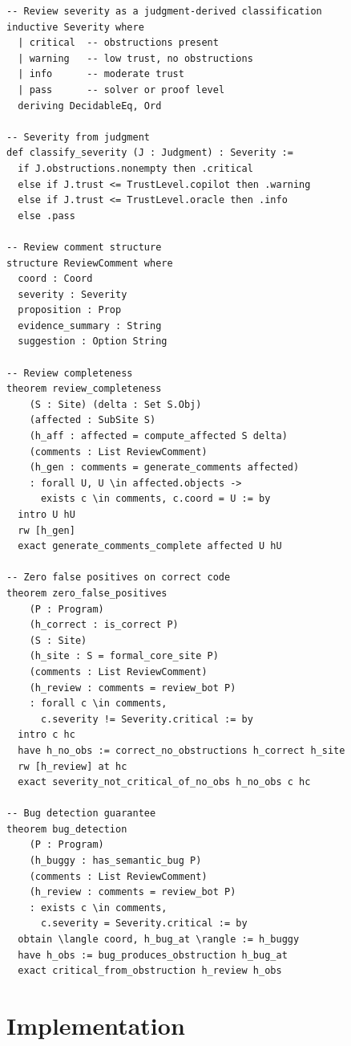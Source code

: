 \documentclass[11pt]{article}
\begin{document}
\begin{lstlisting}[language=lean,basicstyle=\small\ttfamily,
  keywordstyle=\bfseries,frame=single,xleftmargin=1em]
-- Review severity as a judgment-derived classification
inductive Severity where
  | critical  -- obstructions present
  | warning   -- low trust, no obstructions
  | info      -- moderate trust
  | pass      -- solver or proof level
  deriving DecidableEq, Ord

-- Severity from judgment
def classify_severity (J : Judgment) : Severity :=
  if J.obstructions.nonempty then .critical
  else if J.trust <= TrustLevel.copilot then .warning
  else if J.trust <= TrustLevel.oracle then .info
  else .pass

-- Review comment structure
structure ReviewComment where
  coord : Coord
  severity : Severity
  proposition : Prop
  evidence_summary : String
  suggestion : Option String

-- Review completeness
theorem review_completeness
    (S : Site) (delta : Set S.Obj)
    (affected : SubSite S)
    (h_aff : affected = compute_affected S delta)
    (comments : List ReviewComment)
    (h_gen : comments = generate_comments affected)
    : forall U, U \in affected.objects ->
      exists c \in comments, c.coord = U := by
  intro U hU
  rw [h_gen]
  exact generate_comments_complete affected U hU

-- Zero false positives on correct code
theorem zero_false_positives
    (P : Program)
    (h_correct : is_correct P)
    (S : Site)
    (h_site : S = formal_core_site P)
    (comments : List ReviewComment)
    (h_review : comments = review_bot P)
    : forall c \in comments,
      c.severity != Severity.critical := by
  intro c hc
  have h_no_obs := correct_no_obstructions h_correct h_site
  rw [h_review] at hc
  exact severity_not_critical_of_no_obs h_no_obs c hc

-- Bug detection guarantee
theorem bug_detection
    (P : Program)
    (h_buggy : has_semantic_bug P)
    (comments : List ReviewComment)
    (h_review : comments = review_bot P)
    : exists c \in comments,
      c.severity = Severity.critical := by
  obtain \langle coord, h_bug_at \rangle := h_buggy
  have h_obs := bug_produces_obstruction h_bug_at
  exact critical_from_obstruction h_review h_obs
\end{lstlisting}

\section{Implementation}\label{sec:implementation}
\end{document}
